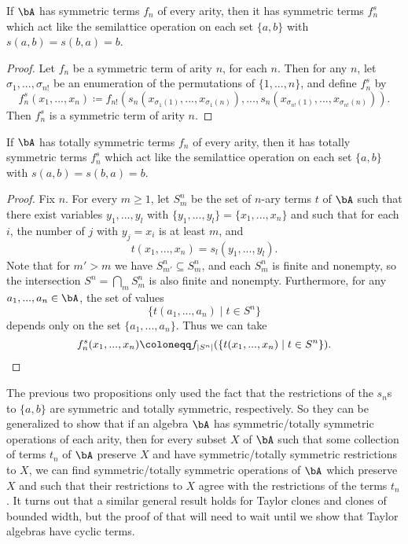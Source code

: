 \begin{prop} If $\bA$ has symmetric terms $f_n$ of every arity, then it has symmetric terms $f_n^s$ which act like the semilattice operation on each set $\{a,b\}$ with $s(a,b) = s(b,a) = b$.
\end{prop}
\begin{proof} Let $f_n$ be a symmetric term of arity $n$, for each $n$. Then for any $n$, let $\sigma_1, ..., \sigma_{n!}$ be an enumeration of the permutations of $\{1, ..., n\}$, and define $f_n^s$ by
\[
f_n^s(x_1, ..., x_n) \coloneqq f_{n!}(s_n(x_{\sigma_1(1)}, ..., x_{\sigma_1(n)}), ..., s_n(x_{\sigma_{n!}(1)}, ..., x_{\sigma_{n!}(n)})).
\]
Then $f_n^s$ is a symmetric term of arity $n$.
\end{proof}

\begin{prop} If $\bA$ has totally symmetric terms $f_n$ of every arity, then it has totally symmetric terms $f_n^s$ which act like the semilattice operation on each set $\{a,b\}$ with $s(a,b) = s(b,a) = b$.
\end{prop}
\begin{proof} Fix $n$. For every $m \ge 1$, let $S^n_m$ be the set of $n$-ary terms $t$ of $\bA$ such that there exist variables $y_1, ..., y_l$ with $\{y_1, ..., y_l\} = \{x_1, ..., x_n\}$ and such that for each $i$, the number of $j$ with $y_j = x_i$ is at least $m$, and
\[
t(x_1, ..., x_n) = s_l(y_1, ..., y_l).
\]
Note that for $m' > m$ we have $S^n_{m'} \subseteq S^n_m$, and each $S^n_m$ is finite and nonempty, so the intersection $S^n = \bigcap_m S^n_m$ is also finite and nonempty. Furthermore, for any $a_1, ..., a_n \in \bA$, the set of values
\[
\{t(a_1, ..., a_n) \mid t \in S^n\}
\]
depends only on the set $\{a_1, ..., a_n\}$. Thus we can take
\[
f_n^s(x_1, ..., x_n) \coloneqq f_{|S^n|}(\{t(x_1, ..., x_n) \mid t \in S^n\}).\qedhere
\]
\end{proof}

\begin{rem} The previous two propositions only used the fact that the restrictions of the $s_n$s to $\{a,b\}$ are symmetric and totally symmetric, respectively. So they can be generalized to show that if an algebra $\bA$ has symmetric/totally symmetric operations of each arity, then for every subset $X$ of $\bA$ such that some collection of terms $t_n$ of $\bA$ preserve $X$ and have symmetric/totally symmetric restrictions to $X$, we can find symmetric/totally symmetric operations of $\bA$ which preserve $X$ and such that their restrictions to $X$ agree with the restrictions of the terms $t_n$. It turns out that a similar general result holds for Taylor clones and clones of bounded width, but the proof of that will need to wait until we show that Taylor algebras have cyclic terms.
\end{rem}

